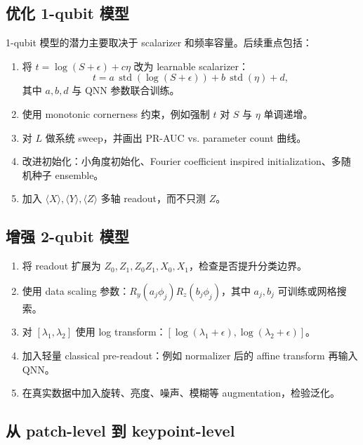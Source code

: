\documentclass[UTF8,zihao=-4]{ctexart}
\begin{document}
\subsection{优化 1-qubit 模型}

1-qubit 模型的潜力主要取决于 scalarizer 和频率容量。后续重点包括：
\begin{enumerate}[leftmargin=2.0em]
    \item 将 $t=\log(S+\epsilon)+c\eta$ 改为 learnable scalarizer：
    \begin{equation}
        t=a\,\operatorname{std}(\log(S+\epsilon))+b\,\operatorname{std}(\eta)+d,
    \end{equation}
    其中 $a,b,d$ 与 QNN 参数联合训练。
    \item 使用 monotonic cornerness 约束，例如强制 $t$ 对 $S$ 与 $\eta$ 单调递增。
    \item 对 $L$ 做系统 sweep，并画出 PR-AUC vs. parameter count 曲线。
    \item 改进初始化：小角度初始化、Fourier coefficient inspired initialization、多随机种子 ensemble。
    \item 加入 $\langle X\rangle,\langle Y\rangle,\langle Z\rangle$ 多轴 readout，而不只测 $Z$。
\end{enumerate}

\subsection{增强 2-qubit 模型}

\begin{enumerate}[leftmargin=2.0em]
    \item 将 readout 扩展为 $Z_0,Z_1,Z_0Z_1,X_0,X_1$，检查是否提升分类边界。
    \item 使用 data scaling 参数：$R_y(a_j\phi_j)R_z(b_j\phi_j)$，其中 $a_j,b_j$ 可训练或网格搜索。
    \item 对 $[\lambda_1,\lambda_2]$ 使用 log transform：$[\log(\lambda_1+\epsilon),\log(\lambda_2+\epsilon)]$。
    \item 加入轻量 classical pre-readout：例如 normalizer 后的 affine transform 再输入 QNN。
    \item 在真实数据中加入旋转、亮度、噪声、模糊等 augmentation，检验泛化。
\end{enumerate}

\subsection{从 patch-level 到 keypoint-level}
\end{document}
